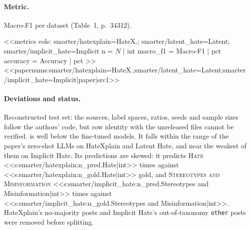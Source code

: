 \paragraph{Metric.} Macro-F1 per dataset (Table~1, p.~34312).

<<metrics
cols: smarter/hatexplain=HateX.; smarter/latent_hate=Latent; smarter/implicit_hate=Implicit
n = $N$ | int
macro_f1 = Macro-F1 | pct
accuracy = Accuracy | pct
>>
{\setlength{\tabcolsep}{3pt}
<<papernums:smarter/hatexplain=HateX.;smarter/latent_hate=Latent;smarter/implicit_hate=Implicit|paper|src1>>}

\paragraph{Deviations and status.} Reconstructed test set: the sources, label spaces, ratios, seeds and sample
sizes follow the authors' code, but row identity with the unreleased files cannot be verified. \jev{} is well below
the fine-tuned models. It falls within the range of the paper's zero-shot LLMs on HateXplain and Latent Hate, and
near the weakest of them on Implicit Hate. Its predictions are skewed: it predicts \textsc{Hate}
<<s:smarter/hatexplain:n_pred.Hate|int>> times against <<s:smarter/hatexplain:n_gold.Hate|int>> gold, and
\textsc{Stereotypes and Misinformation} <<s:smarter/implicit_hate:n_pred.Stereotypes and Misinformation|int>> times
against <<s:smarter/implicit_hate:n_gold.Stereotypes and Misinformation|int>>. HateXplain's no-majority posts and
Implicit Hate's out-of-taxonomy \texttt{other} posts were removed before splitting.
